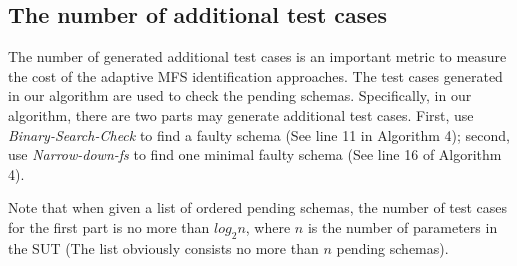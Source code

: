 \documentclass{sig-alternate-05-2015}
\begin{document}
{{{%
%

\subsection{The number of additional  test cases}
The number of generated additional test cases is an important metric to measure the cost of the adaptive MFS identification approaches. The test cases generated in our algorithm are used to check the pending schemas. Specifically, in our algorithm, there are two parts may generate additional test cases. First, use \emph{ Binary-Search-Check} to find a faulty schema (See line 11 in Algorithm 4); second, use \emph{Narrow-down-fs} to find one minimal faulty schema (See line 16 of Algorithm 4).

Note that when given a list of ordered pending schemas, the number of test cases for the first part is no more than $log_{2}n$, where $n$ is the number of parameters in the SUT (The list obviously consists no more than $n$ pending schemas).

}}}
\end{document}

